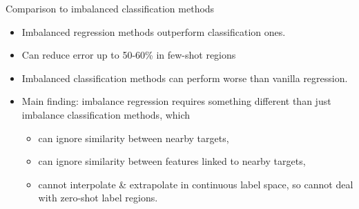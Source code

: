 \begin{frame}{Comparison to imbalanced classification methods}
\begin{table}[ht]
\begin{center}
{			}
		\end{center}
	\end{table}
	\begin{itemize}\setlength\itemsep{.5em}\footnotesize
		\item Imbalanced regression methods outperform classification ones.
		\item Can reduce error up to 50-60\% in few-shot regions
		\item Imbalanced classification methods can perform worse than vanilla regression.
		\item Main finding: imbalance regression requires something different than just imbalance classification methods, which
		\begin{itemize}\setlength\itemsep{.1em}\footnotesize
			\item can ignore similarity between nearby targets,
			\item can ignore similarity between features linked to nearby targets,
			\item cannot interpolate \& extrapolate in continuous label space, so cannot deal with zero-shot label regions.
		\end{itemize}
	\end{itemize}
\end{frame}